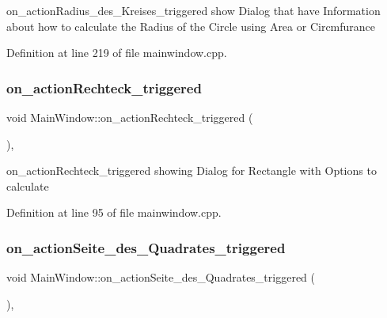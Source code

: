on\+\_\+action\+Radius\+\_\+des\+\_\+\+Kreises\+\_\+triggered show Dialog that have Information about how to calculate the Radius of the Circle using Area or Circmfurance 



Definition at line 219 of file mainwindow.\+cpp.

\mbox{\label{class_main_window_ada63622ae1c854de4bb80282e490eb14}} 
\subsubsection{\texorpdfstring{on\+\_\+action\+Rechteck\+\_\+triggered}{on\_actionRechteck\_triggered}}
{\footnotesize\ttfamily void Main\+Window\+::on\+\_\+action\+Rechteck\+\_\+triggered (\begin{DoxyParamCaption}{ }\end{DoxyParamCaption})\hspace{0.3cm}{\ttfamily [private]}, {\ttfamily [slot]}}



on\+\_\+action\+Rechteck\+\_\+triggered showing Dialog for Rectangle with Options to calculate 



Definition at line 95 of file mainwindow.\+cpp.

\mbox{\label{class_main_window_afb97ac9d597cbe05644fca0581c4d234}} 
\subsubsection{\texorpdfstring{on\+\_\+action\+Seite\+\_\+des\+\_\+\+Quadrates\+\_\+triggered}{on\_actionSeite\_des\_Quadrates\_triggered}}
{\footnotesize\ttfamily void Main\+Window\+::on\+\_\+action\+Seite\+\_\+des\+\_\+\+Quadrates\+\_\+triggered (\begin{DoxyParamCaption}{ }\end{DoxyParamCaption})\hspace{0.3cm}{\ttfamily [private]}, {\ttfamily [slot]}}



